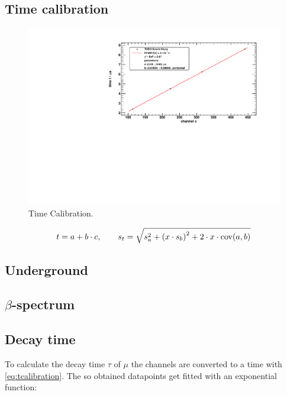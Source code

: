 \subsection{Time calibration}
\begin{figure}[H]
\begin{center}
  \includegraphics[width=\textwidth]{../img/timeCalibration.pdf}
  \caption{Time Calibration.}
  \label{img:timecalibration}
\end{center}
\end{figure}

\begin{equation}
\label{eq:tcalibration}
    t = a + b \cdot c, \qquad s_t = \sqrt{s_a^2 + \left(x \cdot s_b \right)^2 + 2 \cdot x \cdot \operatorname{cov}(a,b)}
\end{equation}

\subsection{Underground}

\subsection{$\beta$-spectrum}

\subsection{Decay time}
To calculate the decay time $\tau$ of $\mu$ the channels are converted to a time with \autoref{eq:tcalibration}. 
The so obtained datapoints get fitted with an exponential function:
\begin{equation}
    
\end{equation}